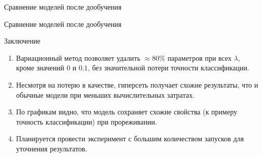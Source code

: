 \documentclass[9pt,pdf,hyperref={unicode}]{beamer}
\begin{document}
\begin{frame}[shrink=5]{Сравнение моделей после дообучения}
\begin{figure}[h]
\begin{minipage}[h]{0.49\linewidth}
\end{minipage}
\hfill
\begin{minipage}[h]{0.49\linewidth}
\end{minipage}

\label{ris:image1}
\end{figure}
\end{frame}
\begin{frame}[shrink=5]{Сравнение моделей после дообучения}
\begin{figure}[h]
\begin{minipage}[h]{0.49\linewidth}
\end{minipage}
\hfill
\begin{minipage}[h]{0.49\linewidth}
\end{minipage}

\label{ris:image1}
\end{figure}
\end{frame}


\begin{frame}{Заключение}
\justifying

	\begin{enumerate}
	\justifying
		\item  Вариационный метод позволяет удалить $ \approx 80\% $ параметров при всех $\lambda$, кроме значений $0$  и $0.1$, без значительной потери точности классификации.
		\item  Несмотря на потерю в качестве, гиперсеть получает схожие результаты, что и обычные модели при меньших вычислительных затратах.
		\item  По графикам видно, что модель сохраняет схожие свойства (к примеру точность классификации) при прореживании.
		\item  Планируется провести эксперимент с большим количеством запусков для уточнения результатов.
	\end{enumerate}
	

\end{frame}
\end{document}
